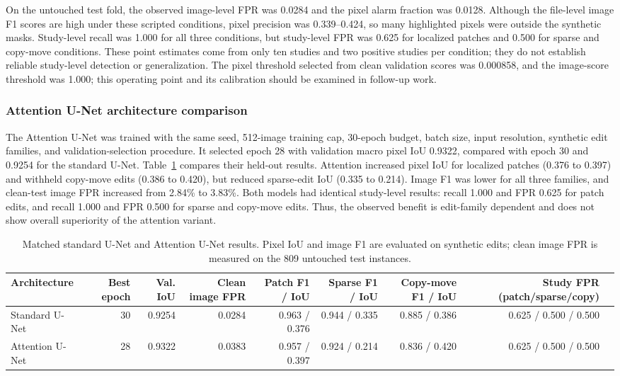 \documentclass[journal]{IEEEtran}
\begin{document}
  On the untouched test fold, the observed image-level FPR was 0.0284 and the pixel alarm fraction was 0.0128. Although the file-level image F1 scores are high under these scripted conditions, pixel precision was 0.339--0.424, so many highlighted pixels were outside the synthetic masks. Study-level recall was 1.000 for all three conditions, but study-level FPR was 0.625 for localized patches and 0.500 for sparse and copy-move conditions. These point estimates come from only ten studies and two positive studies per condition; they do not establish reliable study-level detection or generalization. The pixel threshold selected from clean validation scores was 0.000858, and the image-score threshold was 1.000; this operating point and its calibration should be examined in follow-up work.

  \subsubsection{Attention U-Net architecture comparison}
  The Attention U-Net was trained with the same seed, 512-image training cap, 30-epoch budget, batch size, input resolution, synthetic edit families, and validation-selection procedure. It selected epoch 28 with validation macro pixel IoU 0.9322, compared with epoch 30 and 0.9254 for the standard U-Net. Table~\ref{tab:attention_compare} compares their held-out results. Attention increased pixel IoU for localized patches (0.376 to 0.397) and withheld copy-move edits (0.386 to 0.420), but reduced sparse-edit IoU (0.335 to 0.214). Image F1 was lower for all three families, and clean-test image FPR increased from 2.84\% to 3.83\%. Both models had identical study-level results: recall 1.000 and FPR 0.625 for patch edits, and recall 1.000 and FPR 0.500 for sparse and copy-move edits. Thus, the observed benefit is edit-family dependent and does not show overall superiority of the attention variant.

  \begin{table}[t]
  \caption{Matched standard U-Net and Attention U-Net results. Pixel IoU and image F1 are evaluated on synthetic edits; clean image FPR is measured on the 809 untouched test instances.}
  \label{tab:attention_compare}
  \centering\scriptsize
  \begin{tabular}{lrrrrrrrr}
  \toprule
  Architecture & Best epoch & Val. IoU & Clean image FPR & Patch F1 / IoU & Sparse F1 / IoU & Copy-move F1 / IoU & Study FPR (patch/sparse/copy) \\
  \midrule
  Standard U-Net & 30 & 0.9254 & 0.0284 & 0.963 / 0.376 & 0.944 / 0.335 & 0.885 / 0.386 & 0.625 / 0.500 / 0.500 \\
  Attention U-Net & 28 & 0.9322 & 0.0383 & 0.957 / 0.397 & 0.924 / 0.214 & 0.836 / 0.420 & 0.625 / 0.500 / 0.500 \\
  \bottomrule
  \end{tabular}
  \end{table}
\end{document}
